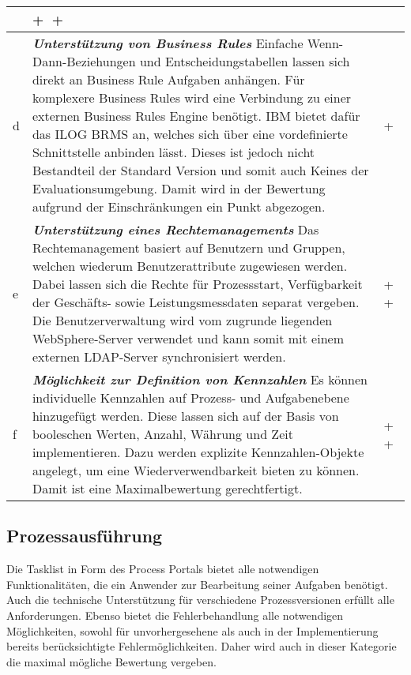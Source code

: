 \begin{longtabu}{@{\extracolsep{\fill}}|p{0.5cm}|X|p{2cm}|}
 & \centering\arraybackslash \textcircled{+} \textcircled{+} \tabularnewline
\hline
 d 
 & \textit{\textbf{Unterstützung von Business Rules}} \newline  Einfache Wenn-Dann-Beziehungen und Entscheidungstabellen lassen sich direkt an Business Rule Aufgaben anhängen. Für komplexere Business Rules wird eine Verbindung zu einer externen Business Rules Engine benötigt. IBM bietet dafür das ILOG \ac{BRMS} an, welches sich über eine vordefinierte Schnittstelle anbinden lässt. Dieses ist jedoch nicht Bestandteil der Standard Version und somit auch Keines der Evaluationsumgebung. Damit wird in der Bewertung aufgrund der Einschränkungen ein Punkt abgezogen. \smallskip
 & \centering\arraybackslash \textcircled{+} \tabularnewline
\hline
 e 
 & \textit{\textbf{Unterstützung eines Rechtemanagements}} \newline  Das Rechtemanagement basiert auf Benutzern und Gruppen, welchen wiederum Benutzerattribute zugewiesen werden. Dabei lassen sich die Rechte für Prozessstart, Verfügbarkeit der Geschäfts- sowie Leistungsmessdaten separat vergeben. Die Benutzerverwaltung wird vom zugrunde liegenden WebSphere-Server verwendet und kann somit mit einem externen \ac{LDAP}-Server synchronisiert werden. \smallskip
 & \centering\arraybackslash \textcircled{+} \textcircled{+} \tabularnewline
\hline
 f \label{ibmKennzahlen}
 & \textit{\textbf{Möglichkeit zur Definition von Kennzahlen}} \newline  Es können individuelle Kennzahlen auf Prozess- und Aufgabenebene hinzugefügt werden.  Diese lassen sich auf der Basis von booleschen Werten, Anzahl, Währung und Zeit implementieren. Dazu werden explizite Kennzahlen-Objekte angelegt, um eine Wiederverwendbarkeit bieten zu können. Damit ist eine Maximalbewertung gerechtfertigt. \smallskip
 & \centering\arraybackslash \textcircled{+} \textcircled{+} \tabularnewline
\hline
\end{longtabu}
\normalsize


\subsection{Prozessausführung}

Die Tasklist in Form des Process Portals bietet alle notwendigen Funktionalitäten, die ein Anwender zur Bearbeitung seiner Aufgaben benötigt. Auch die technische Unterstützung für verschiedene Prozessversionen erfüllt alle Anforderungen. Ebenso bietet die Fehlerbehandlung alle notwendigen Möglichkeiten, sowohl für unvorhergesehene als auch in der Implementierung bereits berücksichtigte Fehlermöglichkeiten. Daher wird auch in dieser Kategorie die maximal mögliche Bewertung vergeben.

